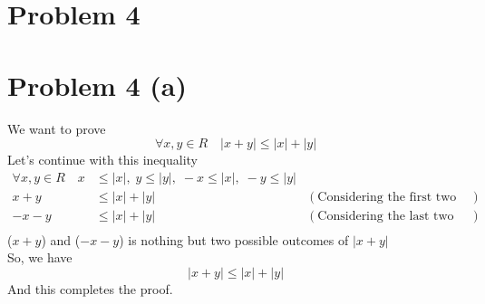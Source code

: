 \documentclass{article}
\begin{document}
\section*{Problem 4}
\section*{Problem 4 (a)}
We want to prove
\[
   \forall x,y \in R \quad |x + y| \leq |x| + |y|
\]
Let's continue with this inequality
\begin{align*}
   \forall x,y \in R \quad x &\leq |x|, \;  y \leq |y|, \; -x \leq |x|, \;  -y \leq |y| \\
   x + y &\leq |x| + |y| &(\text{Considering the first two inequalities above}) \\
   -x - y &\leq |x| + |y| &(\text{Considering the last two inequalities above}) \\
\end{align*}
(\(x+y\)) and (\(-x-y\)) is nothing but two possible outcomes of \(|x+y|\) \\
So, we have
\[
   |x + y| \leq |x| + |y|
\]
And this completes the proof.\\
\end{document}
